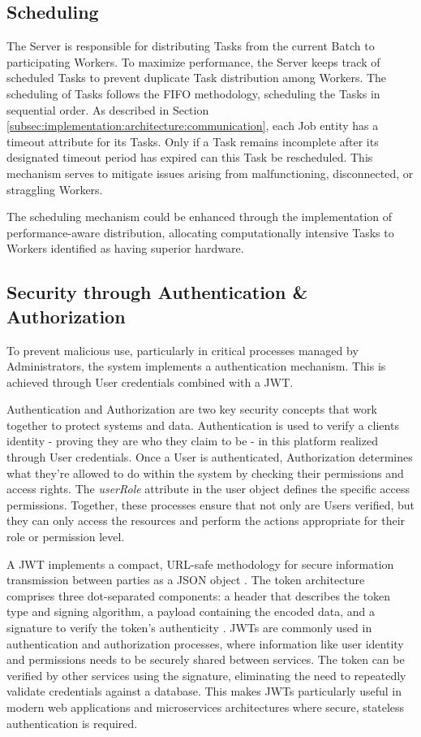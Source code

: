 \subsection{Scheduling}
\label{subsec:implementation:architecture:scheduling}
The Server is responsible for distributing Tasks from the current Batch to participating Workers. To maximize performance, the Server keeps track of scheduled Tasks to prevent duplicate Task distribution among Workers. The scheduling of Tasks follows the \ac{FIFO} methodology, scheduling the Tasks in sequential order. As described in Section \ref{subsec:implementation:architecture:communication}, each Job entity has a timeout attribute for its Tasks. Only if a Task remains incomplete after its designated timeout period has expired can this Task be rescheduled. This mechanism serves to mitigate issues arising from malfunctioning, disconnected, or straggling Workers.

The scheduling mechanism could be enhanced through the implementation of performance-aware distribution, allocating computationally intensive Tasks to Workers identified as having superior hardware.

\subsection{Security through Authentication \& Authorization}
\label{subsec:implementation:authentication}
To prevent malicious use, particularly in critical processes managed by Administrators, the system implements a authentication mechanism. This is achieved through User credentials combined with a \ac{JWT}.

Authentication and Authorization are two key security concepts that work together to protect systems and data. Authentication is used to verify a clients identity - proving they are who they claim to be - in this platform realized through User credentials. Once a User is authenticated, Authorization determines what they're allowed to do within the system by checking their permissions and access rights. The \emph{userRole} attribute in the user object defines the specific access permissions. Together, these processes ensure that not only are Users verified, but they can only access the resources and perform the actions appropriate for their role or permission level.

A \ac{JWT} implements a compact, URL-safe methodology for secure information transmission between parties as a \acs{JSON} object \cite{implementation:jwt}. The token architecture comprises three dot-separated components: a header that describes the token type and signing algorithm, a payload containing the encoded data, and a signature to verify the token's authenticity \cite{implementation:jwt}. \ac{JWT}s are commonly used in authentication and authorization processes, where information like user identity and permissions needs to be securely shared between services. The token can be verified by other services using the signature, eliminating the need to repeatedly validate credentials against a database. This makes \ac{JWT}s particularly useful in modern web applications and microservices architectures where secure, stateless authentication is required. \cite{implementation:jwt}

